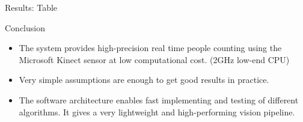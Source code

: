 \documentclass[final,hyperref={pdfpagelabels=false}]{beamer}
\begin{document}
\begin{frame}[t]
\begin{columns}[t]
\begin{column}{.465\textwidth}
\begin{block}{Results: Table}
\end{block}






\begin{block}{Conclusion}

\begin{itemize}
\item The system provides high-precision real time people counting using the Microsoft Kinect sensor at low computational cost. (2GHz low-end CPU)
\item Very simple assumptions are enough to get good results in practice.
\item The software architecture enables fast implementing and testing of different algorithms. It gives a very lightweight and high-performing vision pipeline.
\end{itemize}
\vspace*{0.0\textheight} %
\end{block}

%
%        
%
%
%
%
%


\end{column}
\end{columns}
\end{frame}
\end{document}
